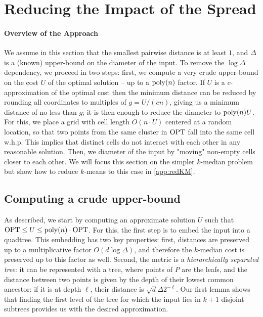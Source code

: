 \section{Reducing the Impact of the Spread}
 \label{sec:theory} %
\newcommand{\boxsize}{\textsc{MaxDist}}

\paragraph*{Overview of the Approach}
We assume in this section that the smallest pairwise distance is at least $1$, and $\Delta$ is a (known) upper-bound on the diameter of the input.
To remove the $\log\Delta$ dependency, we proceed in two steps: first, we compute a very crude upper-bound on the cost $U$ of the optimal solution -- up to
a $\operatorname{poly}(n)$ factor.  If $U$ is a $c$-approximation of the optimal cost then the minimum distance can be reduced by rounding all coordinates to multiples of $g
= U/(cn)$, giving us a minimum distance of no less than $g$; it is then enough to reduce the diameter to $\operatorname{poly}(n) U$.  For this, we place a grid with cell length
$O(n \cdot U)$ centered at a random location, so that two points from the same cluster in $\text{OPT}$ fall into the same cell w.h.p. This implies that distinct cells do not interact with each other
in any reasonable solution.  Then, we diameter of the input by "moving" non-empty cells closer to each other. We will focus this section on the simpler $k$-median
problem but show how to reduce $k$-means to this case in \cref{app:redKM}.


\subsection{Computing a crude upper-bound}

As described, we start by computing an approximate solution $U$ such that $\text{OPT} \leq U \leq \operatorname{poly}(n) \cdot \text{OPT}$. For this, the first step is to embed the input
into a quadtree. This embedding has two key properties: first, distances are preserved up to a multiplicative factor $O(d \log \Delta)$, and therefore the $k$-median cost is preserved up to this factor as well. Second, the metric is a \emph{hierarchically separated tree}: it can be represented with a tree, where points of $P$ are the leafs, and the distance between two points is given by the depth of their lowest common ancestor: if it is at depth $\ell$, their distance is $\sqrt{d} \Delta 2^{-\ell}$. 
 Our first lemma shows
that finding the first level of the tree for which the input lies in $k+1$ disjoint subtrees provides us with the desired approximation. 

